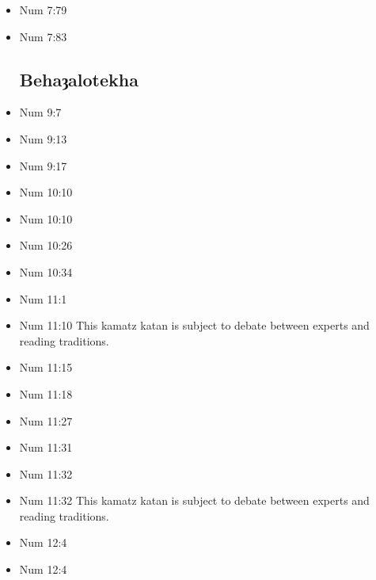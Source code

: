 \documentclass[14pt]{book}
\begin{document}
\begin{multicols}{2}
\begin{itemize}
\item Num 7:79

\item Num 7:83

\subsection{Behaȝalotekha}

\item Num 9:7

\item Num 9:13

\item Num 9:17

\item Num 10:10

\item Num 10:10

\item Num 10:26

\item Num 10:34

\item Num 11:1

\item Num 11:10 This kamatz katan is subject to debate between experts and reading traditions.

\item Num 11:15

\item Num 11:18

\item Num 11:27

\item Num 11:31

\item Num 11:32

\item Num 11:32 This kamatz katan is subject to debate between experts and reading traditions.

\item Num 12:4

\item Num 12:4


\end{itemize}
\end{multicols}
\end{document}
